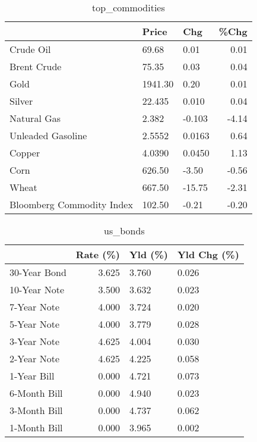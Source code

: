 \documentclass{article}%
\begin{document}
\begin{table}[htbp]%
\caption{top\_commodities}%
\centering%
\begin{adjustbox}{width=1\textwidth}%
\begin{tabular}{lllr}
\toprule
                          &   Price &    Chg &  \%Chg \\
\midrule
               Crude Oil  &   69.68 &   0.01 &  0.01 \\
             Brent Crude  &   75.35 &   0.03 &  0.04 \\
                    Gold  & 1941.30 &   0.20 &  0.01 \\
                  Silver  &  22.435 &  0.010 &  0.04 \\
             Natural Gas  &   2.382 & -0.103 & -4.14 \\
       Unleaded Gasoline  &  2.5552 & 0.0163 &  0.64 \\
                  Copper  &  4.0390 & 0.0450 &  1.13 \\
                    Corn  &  626.50 &  -3.50 & -0.56 \\
                   Wheat  &  667.50 & -15.75 & -2.31 \\
Bloomberg Commodity Index &  102.50 &  -0.21 & -0.20 \\
\bottomrule
\end{tabular}
%
\end{adjustbox}%
\end{table}

%


\begin{table}[htbp]%
\caption{us\_bonds}%
\centering%
\begin{adjustbox}{width=1\textwidth}%
\begin{tabular}{lrll}
\toprule
             &  Rate (\%) & Yld (\%) & Yld Chg (\%) \\
\midrule
30-Year Bond &     3.625 &   3.760 &       0.026 \\
10-Year Note &     3.500 &   3.632 &       0.023 \\
 7-Year Note &     4.000 &   3.724 &       0.020 \\
 5-Year Note &     4.000 &   3.779 &       0.028 \\
 3-Year Note &     4.625 &   4.004 &       0.030 \\
 2-Year Note &     4.625 &   4.225 &       0.058 \\
 1-Year Bill &     0.000 &   4.721 &       0.073 \\
6-Month Bill &     0.000 &   4.940 &       0.023 \\
3-Month Bill &     0.000 &   4.737 &       0.062 \\
1-Month Bill &     0.000 &   3.965 &       0.002 \\
\bottomrule
\end{tabular}
%
\end{adjustbox}%
\end{table}
\end{document}
